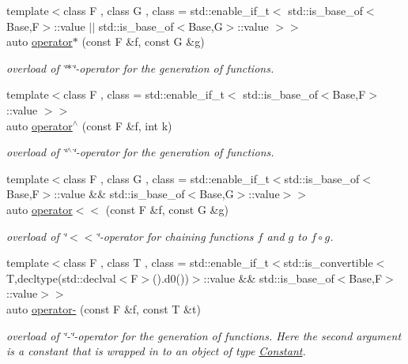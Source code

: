 \begin{DoxyCompactItemize}
{\footnotesize template$<$class F , class G , class  = std\-::enable\-\_\-if\-\_\-t$<$ std\-::is\-\_\-base\-\_\-of$<$\-Base,\-F$>$\-::value $\vert$$\vert$ std\-::is\-\_\-base\-\_\-of$<$\-Base,\-G$>$\-::value $>$$>$ }\\auto \hyperlink{namespaceRFFGen_ab537e59af6c5a4f0f2a7469e8ae6461b}{operator$\ast$} (const F \&f, const G \&g)
\begin{DoxyCompactList}\small\item\em overload of \char`\"{}$\ast$\char`\"{}-\/operator for the generation of functions. \end{DoxyCompactList}\item 
{\footnotesize template$<$class F , class  = std\-::enable\-\_\-if\-\_\-t$<$ std\-::is\-\_\-base\-\_\-of$<$\-Base,\-F$>$\-::value $>$$>$ }\\auto \hyperlink{namespaceRFFGen_a59a4ba5900f079a4023c34cd620fc21d}{operator$^\wedge$} (const F \&f, int k)
\begin{DoxyCompactList}\small\item\em overload of \char`\"{}$^\wedge$\char`\"{}-\/operator for the generation of functions. \end{DoxyCompactList}\item 
{\footnotesize template$<$class F , class G , class  = std\-::enable\-\_\-if\-\_\-t$<$std\-::is\-\_\-base\-\_\-of$<$\-Base,\-F$>$\-::value \&\&                                     std\-::is\-\_\-base\-\_\-of$<$\-Base,\-G$>$\-::value$>$$>$ }\\auto \hyperlink{namespaceRFFGen_a2c40e5d41ad211f6d861f2862a02e670}{operator$<$$<$} (const F \&f, const G \&g)
\begin{DoxyCompactList}\small\item\em overload of \char`\"{}$<$$<$\char`\"{}-\/operator for chaining functions $f$ and $g$ to $ f \circ g $. \end{DoxyCompactList}\item 
{\footnotesize template$<$class F , class T , class  = std\-::enable\-\_\-if\-\_\-t$<$std\-::is\-\_\-convertible$<$\-T,decltype(std\-::declval$<$\-F$>$().\-d0())$>$\-::value \&\&                                     std\-::is\-\_\-base\-\_\-of$<$\-Base,\-F$>$\-::value$>$$>$ }\\auto \hyperlink{namespaceRFFGen_a933ac482bf44b977bbe2ce057362b55a}{operator-\/} (const F \&f, const T \&t)
\begin{DoxyCompactList}\small\item\em overload of \char`\"{}-\/\char`\"{}-\/operator for the generation of functions. Here the second argument is a constant that is wrapped in to an object of type \hyperlink{structRFFGen_1_1Constant}{Constant}. \end{DoxyCompactList}\item 

\end{DoxyCompactItemize}
